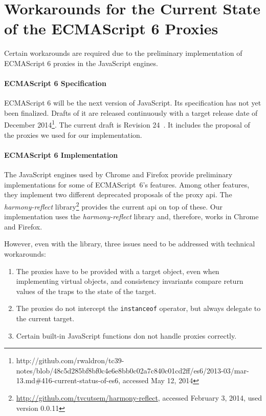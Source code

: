 \section{Workarounds for the Current State of the ECMAScript 6 Proxies} \label{sec:IMPLEMENTATION:4}

Certain workarounds are required due to the preliminary implementation of ECMAScript 6 proxies in the JavaScript engines.

\paragraph{ECMAScript 6 Specification}
ECMAScript 6 will be the next version of JavaScript.
Its specification has not yet been finalized.
Drafts of it are released continuously with a target release date of December 2014\footnote{http://github.com/rwaldron/tc39-notes/blob/48c5d285bf8bf0c4e6e8bb0c02a7c840c01cd2ff/es6/2013-03/mar-13.md\#416-current-status-of-es6, accessed May 12, 2014}.
The current draft is Revision 24~\cite{Ecma2014ES6}.
It includes the proposal of the proxies we used for our implementation.

\paragraph{ECMAScript 6 Implementation}
The JavaScript engines used by Chrome and Firefox provide preliminary implementations for some of ECMAScript~6's features.
Among other features, they implement two different deprecated proposals of the proxy \ac{api}.
The \emph{harmony-reflect} library\footnote{\url{http://github.com/tvcutsem/harmony-reflect}, accessed February 3, 2014, used version 0.0.11} provides the current \ac{api} on top of these.
Our implementation uses the \emph{harmony-reflect} library and, therefore, works in Chrome and Firefox.

However, even with the library, three issues need to be addressed with technical workarounds:

\begin{enumerate}
    \item The proxies have to be provided with a target object, even when implementing virtual objects, and consistency invariants compare return values of the traps to the state of the target. 
    \item The proxies do not intercept the \lstinline{instanceof} operator, but always delegate to the current target.
    \item Certain built-in JavaScript functions don not handle proxies correctly.
\end{enumerate}

